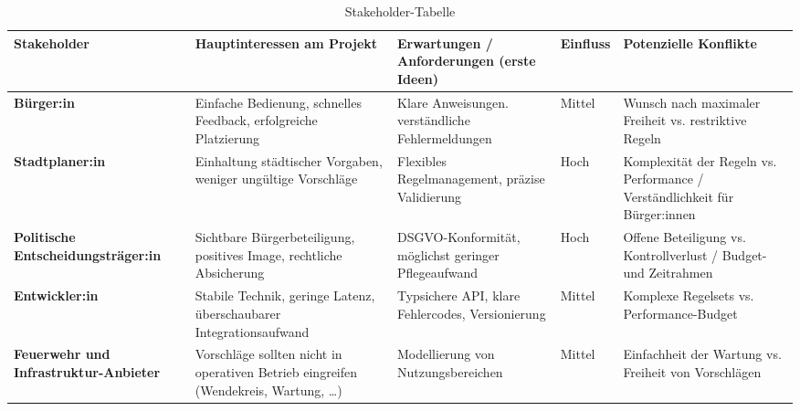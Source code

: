 \begin{landscape}
\begin{table}[!h]
\begin{center}
\bgroup
\def\arraystretch{1.5}
    \begin{tabular}{| p{3cm} | p{5cm} | p{6cm} | p{2cm} | p{6cm} |}
    \hline
\textbf{Stakeholder} & \textbf{Hauptinteressen am Projekt} & \textbf{Erwartungen / Anforderungen (erste Ideen)} & \textbf{Einfluss} & \textbf{Potenzielle Konflikte} \\
\hline
\hline
\textbf{Bürger:in} & Einfache Bedienung, schnelles Feedback, erfolgreiche Platzierung & Klare Anweisungen. verständliche Fehlermeldungen & Mittel & Wunsch nach maximaler Freiheit vs. restriktive Regeln \\
\hline
\textbf{Stadtplaner:in} & Einhaltung städtischer Vorgaben, weniger ungültige Vorschläge & Flexibles Regelmanagement, präzise Validierung & Hoch & Komplexität der Regeln vs. Performance / Verständlichkeit für Bürger:innen \\
\hline
\textbf{Politische Entscheidungsträger:in} & Sichtbare Bürgerbeteiligung, positives Image, rechtliche Absicherung & DSGVO-Konformität, möglichst geringer Pflegeaufwand & Hoch & Offene Beteiligung vs. Kontrollverlust / Budget- und Zeitrahmen \\
\hline
\textbf{Entwickler:in} & Stabile Technik, geringe Latenz, überschaubarer Integrationsaufwand & Typsichere API, klare Fehlercodes, Versionierung & Mittel & Komplexe Regelsets vs. Performance-Budget \\
\hline
\textbf{Feuerwehr und Infrastruktur-Anbieter} & Vorschläge sollten nicht in operativen Betrieb eingreifen (Wendekreis, Wartung, …) & Modellierung von Nutzungsbereichen & Mittel & Einfachheit der Wartung vs. Freiheit von Vorschlägen \\
\hline
\end{tabular}
    \egroup
    
\caption{Stakeholder-Tabelle}
\label{tab:Stakeholder-Tabelle}
\end{center}
\end{table}
\end{landscape}
\FloatBarrier